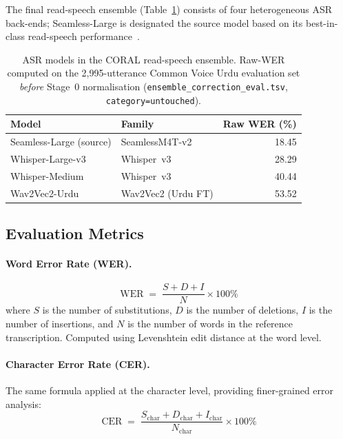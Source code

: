 The final read-speech ensemble (Table~\ref{tab:read-ensemble}) consists of four heterogeneous ASR back-ends; Seamless-Large is designated the source model based on its best-in-class read-speech performance~\cite{arif2024wer}.

\begin{table}[h]
    \centering
    \renewcommand{\arraystretch}{1.25}
    \begin{tabularx}{\textwidth}{Xlr}
    \toprule
    \textbf{Model} & \textbf{Family} & \textbf{Raw WER (\%)} \\
    \midrule
    Seamless-Large (source) & SeamlessM4T-v2     & 18.45 \\
    Whisper-Large-v3        & Whisper~v3         & 28.29 \\
    Whisper-Medium          & Whisper~v3         & 40.44 \\
    Wav2Vec2-Urdu           & Wav2Vec2 (Urdu FT) & 53.52 \\
    \bottomrule
    \end{tabularx}
    \caption{ASR models in the CORAL read-speech ensemble. Raw-WER computed on the 2{,}995-utterance Common Voice Urdu evaluation set \emph{before} Stage~0 normalisation (\texttt{ensemble\_correction\_eval.tsv}, \texttt{category=untouched}).}
    \label{tab:read-ensemble}
\end{table}

\subsection{Evaluation Metrics}
\label{ssec:metrics}

\paragraph{Word Error Rate (WER).}
\begin{equation}
\text{WER} \;=\; \frac{S + D + I}{N} \times 100\%
\end{equation}
where $S$ is the number of substitutions, $D$ is the number of deletions, $I$ is the number of insertions, and $N$ is the number of words in the reference transcription. Computed using Levenshtein edit distance at the word level.

\paragraph{Character Error Rate (CER).}
The same formula applied at the character level, providing finer-grained error analysis:
\begin{equation}
\text{CER} \;=\; \frac{S_{\text{char}} + D_{\text{char}} + I_{\text{char}}}{N_{\text{char}}} \times 100\%
\end{equation}

